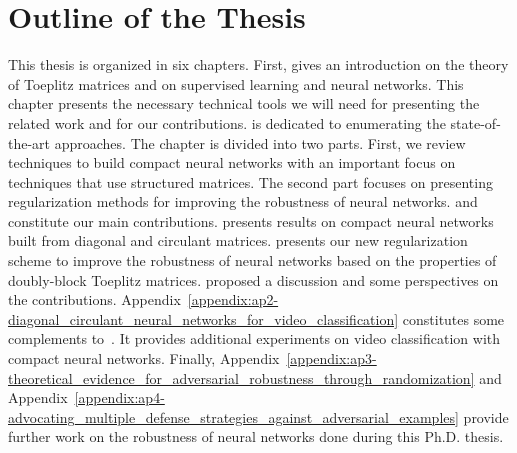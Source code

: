\section*{Outline of the Thesis}
\label{section:ch1-outline_of_the_thesis}

This thesis is organized in six chapters.
First,  gives an introduction on the theory of Toeplitz matrices and on supervised learning and neural networks.
This chapter presents the necessary technical tools we will need for presenting the related work and for our contributions.
 is dedicated to enumerating the state-of-the-art approaches.
The chapter is divided into two parts.
First, we review techniques to build compact neural networks with an important focus on techniques that use structured matrices.
The second part focuses on presenting regularization methods for improving the robustness of neural networks.
 and  constitute our main contributions.
 presents results on compact neural networks built from diagonal and circulant matrices.
 presents our new regularization scheme to improve the robustness of neural networks based on the properties of doubly-block Toeplitz matrices.
 proposed a discussion and some perspectives on the contributions.
Appendix~\ref{appendix:ap2-diagonal_circulant_neural_networks_for_video_classification} constitutes some complements to~.
It provides additional experiments on video classification with compact neural networks.
Finally, Appendix~\ref{appendix:ap3-theoretical_evidence_for_adversarial_robustness_through_randomization} and Appendix~\ref{appendix:ap4-advocating_multiple_defense_strategies_against_adversarial_examples} provide further work on the robustness of neural networks done during this Ph.D. thesis.




